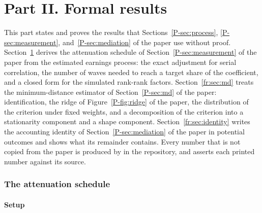 
\part*{Part II. Formal results}

\noindent This part states and proves the results that
Sections~\ref{P-sec:process}, \ref{P-sec:measurement},
and~\ref{P-sec:mediation} of the paper use without proof.
Section~\ref{fr:sec:atten} derives the attenuation schedule of
Section~\ref{P-sec:measurement} of the paper from the estimated earnings
process: the exact adjustment for serial correlation, the number of waves
needed to reach a target share of the coefficient, and a closed form for
the simulated rank-rank factors. Section~\ref{fr:sec:md} treats the
minimum-distance estimator of Section~\ref{P-sec:md} of the paper:
identification, the ridge of Figure~\ref{P-fig:ridge} of the paper, the
distribution of the criterion under fixed weights, and a decomposition of
the criterion into a stationarity component and a shape component.
Section~\ref{fr:sec:identity} writes the accounting identity of
Section~\ref{P-sec:mediation} of the paper in potential outcomes and shows
what its remainder contains. Every number that is not copied from the
paper is produced by  in the
repository, and  asserts each
printed number against its source.

\section{The attenuation schedule}
\label{fr:sec:atten}

\subsection{Setup}

